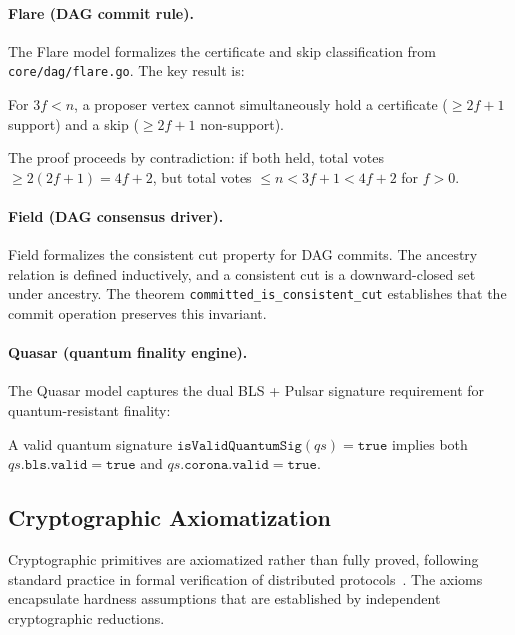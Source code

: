 \paragraph{Flare (DAG commit rule).}
The Flare model formalizes the certificate and skip classification from
\texttt{core/dag/flare.go}. The key result is:

\begin{theorem}
For $3f < n$, a proposer vertex cannot simultaneously hold a certificate ($\geq 2f+1$
support) and a skip ($\geq 2f+1$ non-support).
\end{theorem}

The proof proceeds by contradiction: if both held, total votes
$\geq 2(2f+1) = 4f + 2$, but total votes $\leq n < 3f + 1 < 4f + 2$ for $f > 0$.

\paragraph{Field (DAG consensus driver).}
Field formalizes the consistent cut property for DAG commits. The ancestry relation is
defined inductively, and a consistent cut is a downward-closed set under ancestry.
The theorem \texttt{committed\_is\_consistent\_cut} establishes that the commit operation
preserves this invariant.

\paragraph{Quasar (quantum finality engine).}
The Quasar model captures the dual BLS + Pulsar signature requirement for
quantum-resistant finality:

\begin{theorem}
A valid quantum signature $\texttt{isValidQuantumSig}(qs) = \texttt{true}$ implies both
$qs.\texttt{bls.valid} = \texttt{true}$ and $qs.\texttt{corona.valid} = \texttt{true}$.
\end{theorem}

\subsection{Cryptographic Axiomatization}

Cryptographic primitives are axiomatized rather than fully proved, following standard
practice in formal verification of distributed protocols~\cite{hawblitzel2015ironfleet}.
The axioms encapsulate hardness assumptions that are established by independent
cryptographic reductions.

